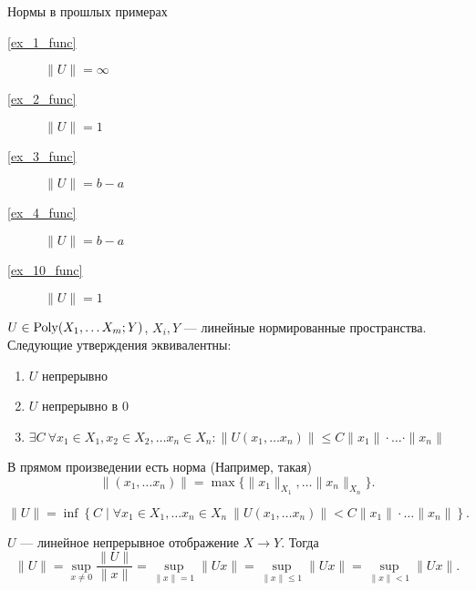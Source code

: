 \begin{ex}
    Нормы в прошлых примерах
    \begin{description}
	\item[\ref{ex_1_func}] $ \| U \|  = \infty$
	\item[\ref{ex_2_func}] $ \| U \|  = 1$
	\item[\ref{ex_3_func}] $ \| U \| = b-a$
	\item[\ref{ex_4_func}] $ \| U \| = b-a$
	    \item[\ref{ex_10_func}] $ \| U \|  = 1$
    \end{description}
\end{ex}
\begin{thm}
    $ U \in  \operatorname{Poly}(X_1, \ldots X_m; Y)$, $X_i, Y  $ --- линейные нормированные пространства. Следующие утверждения эквивалентны:
    \begin{enumerate}
        \item $ U$ непрерывно
	    \item  $ U$ непрерывно в $ 0$ 
	    \item  $ \exists  C ~ \forall  x_1 \in X_1, x_2 \in X_2, \ldots x_n \in X_n \colon \| U(x_1, \ldots x_n) \|  \le  C \| x_1 \| \cdot \ldots \cdot \| x_{n} \| $
    \end{enumerate}
    \begin{note}
	В прямом произведении есть норма (Например, такая) \[
	    \| (x_1, \ldots  x_{n})\| = \max \{\| x_1 \| _{X_1} , \ldots  \| x_{n} \| _{   X_n}\} 
        .\] 
    \end{note}
\end{thm}
\begin{defn}
    \[
	\| U \|  = \inf \left\{ C \mid \forall  x_1 \in X_1, \ldots x_{n} \in X_n ~ \|  U(x_1, \ldots x_{n}) \| < C \| x_1 \| \cdot \ldots \| x_{n} \|    \right\} 
    .\] 
\end{defn}
\begin{thm} 		
    $ U$ --- линейное непрерывное отображение $ X \to  Y$. Тогда
    \[
	\| U \| = \sup_{x\ne 0 }\frac{\| U \| }{\| x \| } = \sup_{\| x \| =1} \|  Ux \| = \sup_{\| x \|  \le 1} \| Ux \| = \sup_{\|  x \| < 1} \| Ux \|  
    .\] 
\end{thm}
